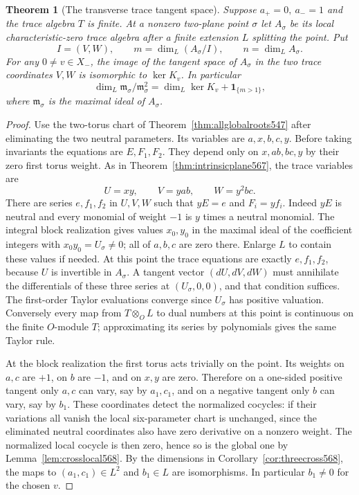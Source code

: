 \documentclass[a4paper,11pt]{article}
\newtheorem{theorem}[proposition]{Theorem}
\theoremstyle{definition}
\theoremstyle{remark}
\numberwithin{equation}{section}
\begin{document}
\begin{theorem}[The transverse trace tangent space]
\leavevmode\label{thm:mixedtrace569}
Suppose \(a_+=0,\ a_-=1\) and the trace algebra \(T\) is finite.
At a nonzero two-plane point \(\sigma\) let \(A_\sigma\) be
its local characteristic-zero trace algebra after a finite
extension \(L\) splitting the point. Put
\[
    I=(V,W),\qquad
    m=\dim_L(A_\sigma/I),\qquad n=\dim_L A_\sigma .
\]
For any \(0\ne v\in X_-\), the image of the tangent space of
\(A_\sigma\) in the two trace coordinates \(V,W\) is
isomorphic to \(\ker K_v\). In particular
\[
   \dim_L \mathfrak m_\sigma/\mathfrak m_\sigma^2
           =\dim_L\ker K_v+\mathbf 1_{\{m>1\}},
\]
where \(\mathfrak m_\sigma\) is the maximal ideal of \(A_\sigma\).
\end{theorem}
\begin{proof}
Use the two-torus chart of Theorem~\ref{thm:allglobalroots547}
after eliminating the two neutral parameters. Its variables
are \(a,x,b,c,y\). Before taking invariants the equations
are \(E,F_1,F_2\). They depend only on \(x,ab,bc,y\)
by their zero first torus weight. As in
Theorem~\ref{thm:intrinsicplane567}, the trace variables are
\[
                U=xy,\qquad V=yab,\qquad W=y^2bc .
\]
There are series \(e,f_1,f_2\) in \(U,V,W\) such that
\(yE=e\) and \(F_i=yf_i\). Indeed \(yE\) is neutral and
every monomial of weight \(-1\) is \(y\) times a neutral
monomial. The integral block realization gives values
\(x_0,y_0\) in the maximal ideal of the coefficient integers
with \(x_0y_0=U_\sigma\ne0\); all of \(a,b,c\) are zero
there. Enlarge \(L\) to contain these values if needed.
At this point the trace equations are exactly \(e,f_1,f_2\),
because \(U\) is invertible in \(A_\sigma\). A tangent
vector \((dU,dV,dW)\) must annihilate the differentials
of these three series at \((U_\sigma,0,0)\), and that
condition suffices. The first-order Taylor evaluations
converge since \(U_\sigma\) has positive valuation.
Conversely every map from \(T\otimes_O L\) to dual numbers
at this point is continuous on the finite \(O\)-module \(T\);
approximating its series by polynomials gives the same
Taylor rule.

At the block realization the first torus acts trivially on
the point. Its weights on \(a,c\) are \(+1\), on \(b\)
are \(-1\), and on \(x,y\) are zero. Therefore on a
one-sided positive tangent only \(a,c\) can vary, say by
\(a_1,c_1\), and on a negative tangent only \(b\) can
vary, say by \(b_1\). These coordinates detect the
normalized cocycles: if their variations all vanish the
local six-parameter chart is unchanged, since the
eliminated neutral coordinates also have zero derivative
on a nonzero weight. The normalized local cocycle is then
zero, hence so is the global one by
Lemma~\ref{lem:crosslocal568}. By the dimensions in
Corollary~\ref{cor:threecross568}, the maps to
\((a_1,c_1)\in L^2\) and \(b_1\in L\) are isomorphisms.
In particular \(b_1\ne0\) for the chosen \(v\).


\end{proof}
\end{document}
